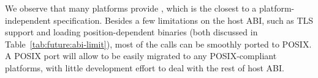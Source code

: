 We observe that many platforms provide ,
which is the closest to a platform-independent specification.
Besides a few limitations on the \graphene{} host ABI,
such as TLS support and loading position-dependent binaries (both discussed in Table~\ref{tab:future:abi-limit}),
most of the \pal{} calls can be smoothly ported to POSIX.
A POSIX port will allow \graphene{} to be easily migrated to any POSIX-compliant platforms,
with little development effort to deal with
the rest of host ABI.








\label{sec:future:partitioning}


%


